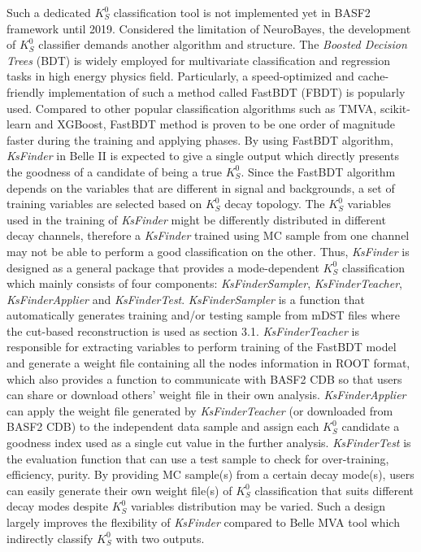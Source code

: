 Such a dedicated $K_S^0$ classification tool is not implemented yet in BASF2 framework until 2019. Considered the limitation of NeuroBayes, the development of $K_S^0$ classifier demands another algorithm and structure. The \textit{Boosted Decision Trees} (BDT) is widely employed for multivariate classification and regression tasks in high energy physics field. Particularly, a speed-optimized and cache-friendly
implementation of such a method called FastBDT (FBDT) is popularly used\cite{keck2016fastbdt}. Compared to other popular classification algorithms such as TMVA\cite{therhaag2012tmva}, scikit-learn\cite{pedregosa2011scikit} and XGBoost\cite{chen2016xgboost}, FastBDT method is proven to be one order of magnitude faster during the training and applying phases\cite{keck2016fastbdt}. 
By using FastBDT algorithm, \textit{KsFinder} in Belle II is expected to give a single output which directly presents the goodness of a candidate of being a true $K_S^0$. Since the FastBDT algorithm depends on the variables that are different in signal and backgrounds, a set of training variables are selected based on $K_S^0$ decay topology.  The $K_S^0$ variables used in the training of \textit{KsFinder} might be differently distributed in different decay channels, therefore a \textit{KsFinder} trained using MC sample from one channel may not be able to perform a good classification on the other. Thus, \textit{KsFinder} is designed as a general package that provides a mode-dependent $K_S^0$ classification which mainly consists of four components: \textit{KsFinderSampler}, \textit{KsFinderTeacher}, \textit{KsFinderApplier} and \textit{KsFinderTest}. \textit{KsFinderSampler} is a function that automatically generates training and/or testing sample from mDST files where the cut-based reconstruction is used as section 3.1. \textit{KsFinderTeacher} is responsible for extracting variables to perform training of the FastBDT model and generate a weight file containing all the nodes information in ROOT format, which also provides a function to communicate with BASF2 CDB so that users can share or download others' weight file in their own analysis. \textit{KsFinderApplier} can apply the weight file generated by \textit{KsFinderTeacher} (or downloaded from BASF2 CDB) to the independent data sample and assign each $K_S^0$ candidate a goodness index used as a single cut value in the further analysis. \textit{KsFinderTest} is the evaluation function that can use a test sample to check for over-training, efficiency, purity.  By providing MC sample(s) from a certain decay mode(s), users can easily generate their own weight file(s) of $K_S^0$ classification that suits different decay modes despite $K_S^0$ variables distribution may be varied. Such a design largely improves the flexibility of \textit{KsFinder} compared to Belle MVA tool which indirectly classify $K_S^0$ with two outputs. 

